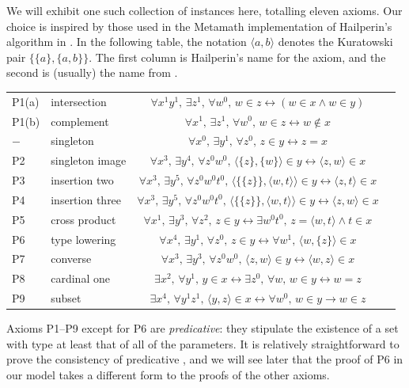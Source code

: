 We will exhibit one such collection of instances here, totalling eleven axioms.
Our choice is inspired by those used in the Metamath implementation of Hailperin's algorithm in \cite{metamath-nf}.
In the following table, the notation \( \langle a, b \rangle \) denotes the Kuratowski pair \( \{ \{ a \}, \{ a, b \} \} \).
The first column is Hailperin's name for the axiom, and the second is (usually) the name from \cite{metamath-nf}.
\begin{center}
  \begin{tabular}{llcl}
    P1(a) & intersection & \( \forall x^1 y^1,\, \exists z^1,\, \forall w^0,\, w \in z \leftrightarrow (w \in x \wedge w \in y) \) \\
    P1(b) & complement & \( \forall x^1,\, \exists z^1,\, \forall w^0,\, w \in z \leftrightarrow w \notin x \) \\
    \( - \) & singleton & \( \forall x^0,\, \exists y^1,\, \forall z^0,\, z \in y \leftrightarrow z = x \) \\
    P2 & singleton image & \( \forall x^3,\, \exists y^4,\, \forall z^0 w^0,\, \langle \{ z \}, \{ w \} \rangle \in y \leftrightarrow \langle z, w \rangle \in x \) \\
    P3 & insertion two & \( \forall x^3,\, \exists y^5,\, \forall z^0 w^0 t^0,\, \langle \{ \{ z \} \}, \langle w, t \rangle \rangle \in y \leftrightarrow \langle z, t \rangle \in x \) \\
    P4 & insertion three & \( \forall x^3,\, \exists y^5,\, \forall z^0 w^0 t^0,\, \langle \{ \{ z \} \}, \langle w, t \rangle \rangle \in y \leftrightarrow \langle z, w \rangle \in x \) \\
    P5 & cross product & \( \forall x^1,\, \exists y^3,\, \forall z^2,\, z \in y \leftrightarrow \exists w^0 t^0,\, z = \langle w, t \rangle \wedge t \in x \) \\
    P6 & type lowering & \( \forall x^4,\, \exists y^1,\, \forall z^0,\, z \in y \leftrightarrow \forall w^1,\, \langle w, \{ z \} \rangle \in x \) \\
    P7 & converse & \( \forall x^3,\, \exists y^3,\, \forall z^0 w^0,\, \langle z, w \rangle \in y \leftrightarrow \langle w, z \rangle \in x \) \\
    P8 & cardinal one & \( \exists x^2,\, \forall y^1,\, y \in x \leftrightarrow \exists z^0,\, \forall w,\, w \in y \leftrightarrow w = z \) \\
    P9 & subset & \( \exists x^4,\, \forall y^1 z^1,\, \langle y, z \rangle \in x \leftrightarrow \forall w^0,\, w \in y \to w \in z \)
  \end{tabular}
\end{center}
Axioms P1--P9 except for P6 are \emph{predicative}: they stipulate the existence of a set with type at least that of all of the parameters.
It is relatively straightforward to prove the consistency of predicative {\TTT}, and we will see later that the proof of P6 in our model takes a different form to the proofs of the other axioms.


